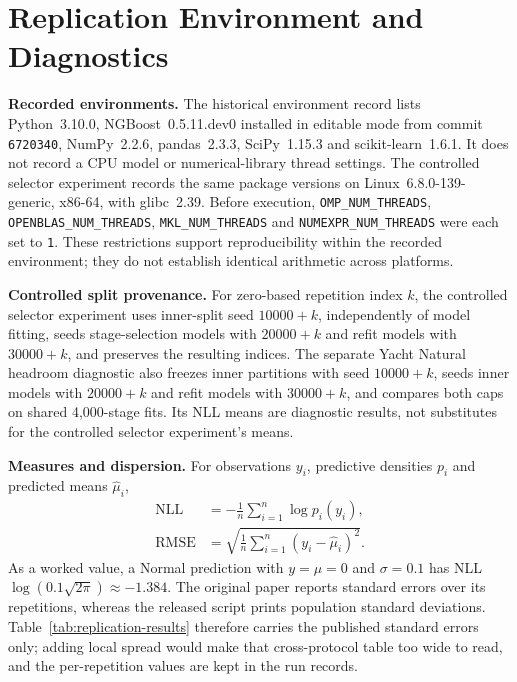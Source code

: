\section{Replication Environment and Diagnostics}
\label{app:replication-environment}

\textbf{Recorded environments.}
The historical environment record lists Python~3.10.0, NGBoost~0.5.11.dev0 installed in editable mode from commit \texttt{6720340}, NumPy~2.2.6, pandas~2.3.3, SciPy~1.15.3 and scikit-learn~1.6.1.
It does not record a CPU model or numerical-library thread settings.
The controlled selector experiment records the same package versions on Linux~6.8.0-139-generic, x86-64, with glibc~2.39.
Before execution, \texttt{OMP\_NUM\_THREADS}, \texttt{OPENBLAS\_NUM\_THREADS}, \texttt{MKL\_NUM\_THREADS} and \texttt{NUMEXPR\_NUM\_THREADS} were each set to \texttt{1}.
These restrictions support reproducibility within the recorded environment; they do not establish identical arithmetic across platforms.

\textbf{Controlled split provenance.}
For zero-based repetition index $k$, the controlled selector experiment uses inner-split seed $10000+k$, independently of model fitting, seeds stage-selection models with $20000+k$ and refit models with $30000+k$, and preserves the resulting indices.
The separate Yacht Natural headroom diagnostic also freezes inner partitions with seed $10000+k$, seeds inner models with $20000+k$ and refit models with $30000+k$, and compares both caps on shared 4{,}000-stage fits.
Its NLL means are diagnostic results, not substitutes for the controlled selector experiment's means.

\textbf{Measures and dispersion.}
For observations $y_i$, predictive densities $p_i$ and predicted means $\hat\mu_i$,
\begin{align*}
\mathrm{NLL} &= -\frac{1}{n}\sum_{i=1}^{n}\log p_i(y_i), \\
\mathrm{RMSE} &= \sqrt{\frac{1}{n}\sum_{i=1}^{n}(y_i-\hat\mu_i)^2}.
\end{align*}
As a worked value, a Normal prediction with $y=\mu=0$ and $\sigma=0.1$ has NLL $\log(0.1\sqrt{2\pi})\approx-1.384$.
The original paper reports standard errors over its repetitions, whereas the released script prints population standard deviations.
Table~\ref{tab:replication-results} therefore carries the published standard errors only; adding local spread would make that cross-protocol table too wide to read, and the per-repetition values are kept in the run records.

